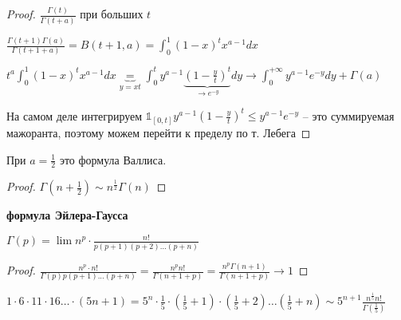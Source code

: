 \begin{proof}
    $\frac{\Gamma(t)}{\Gamma(t + a)}$ при больших $t$

    $\frac{\Gamma(t + 1)\Gamma(a)}{\Gamma(t + 1 + a)} = B(t + 1, a) = \int_{0}^{1}(1 - x)^tx^{a - 1}dx$

    $t^a\int_{0}^{1}(1 - x)^tx^{a - 1}dx \underbrace{=}_{y = xt} \int_{0}^{t}y^{a - 1}\underbrace{(1 - \frac{y}{t})^t}_{\to e^{-y}} dy \to \int_{0}^{+\infty}y^{a-1}e^{-y}dy + \Gamma(a)$

    На самом деле интегрируем $\mathbb{1}_{[0, t]}y^{a-1}(1 - \frac{y}{t})^t \leq y^{a-1}e^{-y}$ -- это суммируемая мажоранта, поэтому можем перейти к пределу по т. Лебега
\end{proof}

\begin{consequence}
    При $a = \frac{1}{2}$ это формула Валлиса.
\end{consequence}

\begin{proof}
    $\Gamma(n + \frac{1}{2}) \sim n^{\frac{1}{2}}\Gamma(n)$
\end{proof}

\begin{theorem}\textbf{формула Эйлера-Гаусса}
    
    $\Gamma(p) = \lim n^p \cdot \frac{n!}{p(p + 1)(p + 2)\dots (p + n)}$

\end{theorem}

\begin{proof}
    $\frac{n^p \cdot n!}{\Gamma(p)p(p + 1)...(p + n)} = \frac{n^p n!}{\Gamma(n + 1 + p)} = \frac{n^p\Gamma(n + 1)}{\Gamma(n + 1 + p)} \to 1$
\end{proof}

\begin{example}
    $1\cdot 6 \cdot 11 \cdot 16 \dots \cdot (5n + 1) = 5^n \cdot \frac{1}{5} \cdot (\frac{1}{5} + 1) \cdot (\frac{1}{5} + 2) \dots (\frac{1}{5} + n) \sim 5^{n+1}\frac{n^{\frac{1}{5}}n!}{\Gamma(\frac{1}{5})}$
\end{example}

